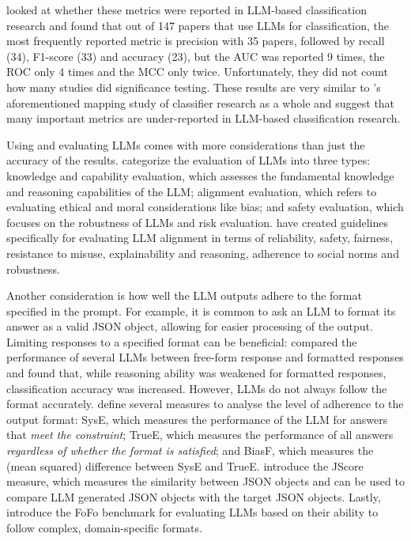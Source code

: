 \documentclass[a4paper]{article}
\begin{document}
\textcite{hou2024} looked at whether these metrics were reported in LLM-based classification research and found that out of 147 papers that use LLMs for classification, the most frequently reported metric is precision with 35 papers, followed by recall (34), F1-score (33) and accuracy (23), but the AUC was reported 9 times, the ROC only 4 times and the MCC only twice. Unfortunately, they did not count how many studies did significance testing. These results are very similar to \textcite{Dellanna2022}'s aforementioned mapping study of classifier research as a whole and suggest that many important metrics are under-reported in LLM-based classification research. 

Using and evaluating LLMs comes with more considerations than just the accuracy of the results. \textcite{guo2023survey} categorize the evaluation of LLMs into three types: knowledge and capability evaluation, which assesses the fundamental knowledge and reasoning capabilities of the LLM; alignment evaluation, which refers to evaluating ethical and moral considerations like bias; and safety evaluation, which focuses on the robustness of LLMs and risk evaluation. \textcite{liu2024} have created guidelines specifically for evaluating LLM alignment in terms of reliability, safety, fairness, resistance to misuse, explainability and reasoning, adherence to social norms and robustness. 

Another consideration is how well the LLM outputs adhere to the format specified in the prompt. For example, it is common to ask an LLM to format its answer as a valid JSON object, allowing for easier processing of the output. Limiting responses to a specified format can be beneficial: \textcite{tam2024format} compared the performance of several LLMs between free-form response and formatted responses and found that, while reasoning ability was weakened for formatted responses, classification accuracy was increased. However, LLMs do not always follow the format accurately. \textcite{long2025format} define several measures to analyse the level of adherence to the output format: SysE, which measures the performance of the LLM for answers that \textit{meet the constraint}; TrueE, which measures the performance of all answers \textit{regardless of whether the format is satisfied}; and BiasF, which measures the (mean squared) difference between SysE and TrueE. \textcite{Li2024format} introduce the JScore measure, which measures the similarity between JSON objects and can be used to compare LLM generated JSON objects with the target JSON objects. Lastly, \textcite{xia2024fofo} introduce the FoFo benchmark for evaluating LLMs based on their ability to follow complex, domain-specific formats. 
\end{document}
